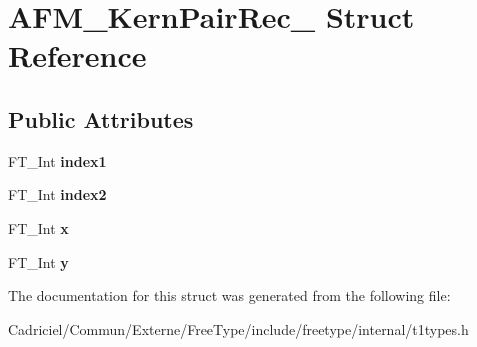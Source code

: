 \hypertarget{struct_a_f_m___kern_pair_rec__}{\section{A\-F\-M\-\_\-\-Kern\-Pair\-Rec\-\_\- Struct Reference}
\label{struct_a_f_m___kern_pair_rec__}
}
\subsection*{Public Attributes}
\begin{DoxyCompactItemize}
\item 
\hypertarget{struct_a_f_m___kern_pair_rec___a732bca56dd4a070b1d887ada1637e810}{F\-T\-\_\-\-Int {\bfseries index1}}\label{struct_a_f_m___kern_pair_rec___a732bca56dd4a070b1d887ada1637e810}

\item 
\hypertarget{struct_a_f_m___kern_pair_rec___aee548123779323c255180112c7f5b831}{F\-T\-\_\-\-Int {\bfseries index2}}\label{struct_a_f_m___kern_pair_rec___aee548123779323c255180112c7f5b831}

\item 
\hypertarget{struct_a_f_m___kern_pair_rec___a4b7f90a0e17ed89353fec14ddb29fa12}{F\-T\-\_\-\-Int {\bfseries x}}\label{struct_a_f_m___kern_pair_rec___a4b7f90a0e17ed89353fec14ddb29fa12}

\item 
\hypertarget{struct_a_f_m___kern_pair_rec___aa177aa612e79701261eba72c76ea3f08}{F\-T\-\_\-\-Int {\bfseries y}}\label{struct_a_f_m___kern_pair_rec___aa177aa612e79701261eba72c76ea3f08}

\end{DoxyCompactItemize}


The documentation for this struct was generated from the following file\-:\begin{DoxyCompactItemize}
\item 
Cadriciel/\-Commun/\-Externe/\-Free\-Type/include/freetype/internal/t1types.\-h\end{DoxyCompactItemize}
